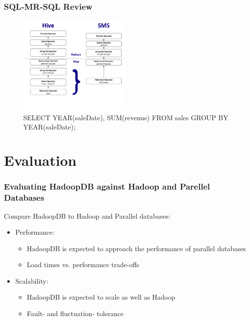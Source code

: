 \documentclass{beamer}
\begin{document}
\begin{frame}
  \frametitle{SQL-MR-SQL Review}
  \begin{figure}
    \centering
    \begin{center}
      \includegraphics[width=0.5\textwidth]{SQL-MR-SQL}
    \end{center}    
    \caption{   SELECT YEAR(saleDate), SUM(revenue) FROM sales GROUP BY YEAR(saleDate);
    }
  \end{figure}
\end{frame}

\section{Evaluation}
\label{sec:evaluation}


\begin{frame}
  \frametitle{Evaluating HadoopDB against Hadoop and Parellel Databases}
  Compare HadoopDB to Hadoop and Parallel databases:
  \begin{itemize}
  \item Performance:
    \begin{itemize}
    \item HadoopDB is expected to approach the performance of
      parallel databases
    \item Load times vs. performance trade-offs
    \end{itemize}
  \item Scalability:
    \begin{itemize}
    \item HadoopDB is expected to scale as well as Hadoop
    \item Fault- and fluctuation- tolerance
    \end{itemize}
  \end{itemize}
\end{frame}
\end{document}
